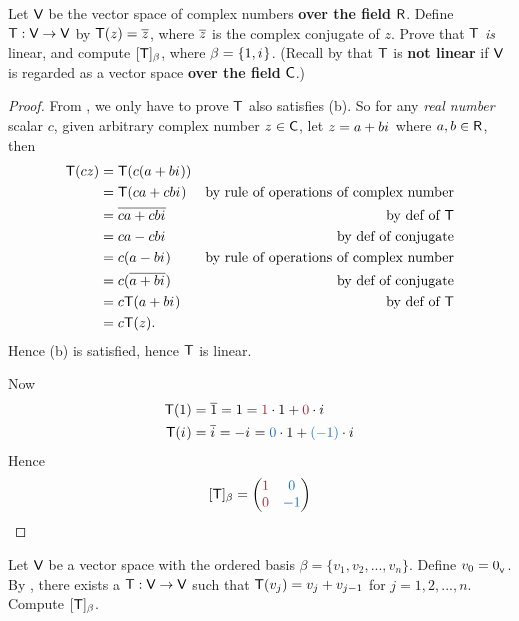 \begin{exercise} \label{exercise 2.2.9}
Let \(\textsf{V}\) be the vector space of complex numbers \textbf{over the field} \(\textsf{R}\).
Define \(\textsf{T} : \textsf{V} \to \textsf{V}\) by \(\textsf{T}(z) = \overline{z}\), where \(\overline{z}\) is the complex conjugate of \(z\).
Prove that \(\textsf{T}\) \emph{is} linear, and compute \([\textsf{T}]_{\beta}\), where \(\beta = \{ 1, {i\mkern1mu} \}\).
(Recall by  that \(\textsf{T}\) is \textbf{not linear} if \(\textsf{V}\) is regarded as a vector space \textbf{over the field} \(\textsf{C}\).)
\end{exercise}

\begin{proof}
From , we only have to prove \(\textsf{T}\) also satisfies (b).
So for any \emph{real number} scalar \(c\), given arbitrary complex number \(z \in \textsf{C}\), let \(z = a + b{i\mkern1mu}\) where \(a, b \in \textsf{R}\), then
\begin{align*}
    \textsf{T}(cz) & = \textsf{T}(c(a + b{i\mkern1mu})) \\
           & = \textsf{T}(ca + cb{i\mkern1mu}) & \text{by rule of operations of complex number} \\
           & = \overline{ca + cb{i\mkern1mu}} & \text{by def of \(\textsf{T}\)} \\
           & = ca - cb{i\mkern1mu} & \text{by def of conjugate} \\
           & = c(a - b{i\mkern1mu}) & \text{by rule of operations of complex number} \\
           & = c(\overline{a + b{i\mkern1mu}}) & \text{by def of conjugate} \\
           & = c\textsf{T}(a + b{i\mkern1mu}) & \text{by def of \(\textsf{T}\)} \\
           & = c\textsf{T}(z).
\end{align*}
Hence (b) is satisfied, hence \(\textsf{T}\) is linear.

Now
\begin{align*}
    \T(1) & = \conjugatet{1} = 1 = \MAROON{1} \cdot 1 + \MAROON{0} \cdot \iu \\
    \T(\iu) & = \conjugatet{\iu} = -\iu = \BLUE{0} \cdot 1 + \BLUE{(-1)} \cdot \iu \\
\end{align*}
Hence
\[
    [\T]_{\beta} = \begin{pmatrix}
        \MAROON{1} & \BLUE{0} \\
        \MAROON{0} & \BLUE{-1} \\
    \end{pmatrix}
\]
\end{proof}

\begin{exercise} \label{exercise 2.2.10}
Let \(\textsf{V}\) be a vector space with the ordered basis \(\beta = \{ v_1, v_2, ..., v_n \}\).
Define \(v_0 = 0_{_{\textsf{V}}}\).
By , there exists a \LTRAN{} \(\textsf{T}: \textsf{V} \to \textsf{V}\) such that \(\textsf{T}(v_j) = v_j + v_{j - 1}\) for \(j = 1, 2, ..., n\).
Compute \([\textsf{T}]_{\beta}\).
\end{exercise}

